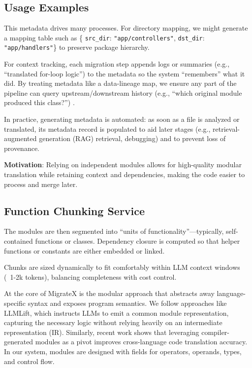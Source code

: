 \documentclass[twocolumn]{article}
\begin{document}
\subsection*{Usage Examples}

This metadata drives many processes. For directory mapping, we might generate a mapping table such as \{ \texttt{src\_dir}: \texttt{"app/controllers"}, \texttt{dst\_dir}: \texttt{"app/handlers"}\} to preserve package hierarchy. 

For context tracking, each migration step appends logs or summaries (e.g., ``translated for-loop logic'') to the metadata so the system ``remembers'' what it did. By treating metadata like a data-lineage map, we ensure any part of the pipeline can query upstream/downstream history (e.g., ``which original module produced this class?'') \cite{hu2024memserve} \cite{yao2024cacheblend}.

In practice, generating metadata is automated: as soon as a file is analyzed or translated, its metadata record is populated to aid later stages (e.g., retrieval-augmented generation (RAG) retrieval, debugging) and to prevent loss of provenance.

\textbf{Motivation}: Relying on independent modules allows for high-quality modular translation while retaining context and dependencies, making the code easier to process and merge later.

\subsection{Function Chunking Service}

The modules are then segmented into ``units of functionality''---typically, self-contained functions or classes. Dependency closure is computed so that helper functions or constants are either embedded or linked.

Chunks are sized dynamically to fit comfortably within LLM context windows (~1-2k tokens), balancing completeness with cost control.

At the core of MigrateX is the modular approach that abstracts away language-specific syntax and exposes program semantics. We follow approaches like LLMLift, which instructs LLMs to emit a common module representation, capturing the necessary logic without relying heavily on an intermediate representation (IR). Similarly, recent work shows that leveraging compiler-generated modules as a pivot improves cross-language code translation accuracy. In our system, modules are designed with fields for operators, operands, types, and control flow.
\end{document}
